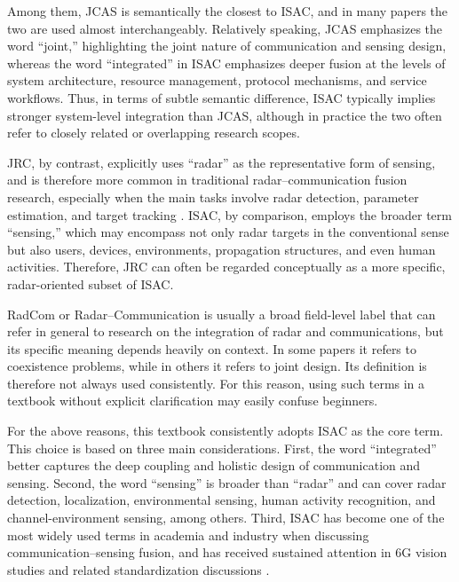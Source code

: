 Among them, JCAS is semantically the closest to ISAC, and in many papers the two are used almost interchangeably. Relatively speaking, JCAS emphasizes the word ``joint,'' highlighting the joint nature of communication and sensing design, whereas the word ``integrated'' in ISAC emphasizes deeper fusion at the levels of system architecture, resource management, protocol mechanisms, and service workflows. Thus, in terms of subtle semantic difference, ISAC typically implies stronger system-level integration than JCAS, although in practice the two often refer to closely related or overlapping research scopes.

JRC, by contrast, explicitly uses ``radar'' as the representative form of sensing, and is therefore more common in traditional radar--communication fusion research, especially when the main tasks involve radar detection, parameter estimation, and target tracking \cite{Liu2020JointRadarComm,Hassanien2015dual}. ISAC, by comparison, employs the broader term ``sensing,'' which may encompass not only radar targets in the conventional sense but also users, devices, environments, propagation structures, and even human activities. Therefore, JRC can often be regarded conceptually as a more specific, radar-oriented subset of ISAC.

RadCom or Radar--Communication is usually a broad field-level label that can refer in general to research on the integration of radar and communications, but its specific meaning depends heavily on context. In some papers it refers to coexistence problems, while in others it refers to joint design. Its definition is therefore not always used consistently. For this reason, using such terms in a textbook without explicit clarification may easily confuse beginners.

For the above reasons, this textbook consistently adopts ISAC as the core term. This choice is based on three main considerations. First, the word ``integrated'' better captures the deep coupling and holistic design of communication and sensing. Second, the word ``sensing'' is broader than ``radar'' and can cover radar detection, localization, environmental sensing, human activity recognition, and channel-environment sensing, among others. Third, ISAC has become one of the most widely used terms in academia and industry when discussing communication--sensing fusion, and has received sustained attention in 6G vision studies and related standardization discussions \cite{Liu2022ISAC,Gonzalez2024integrated,De2021convergent}.

